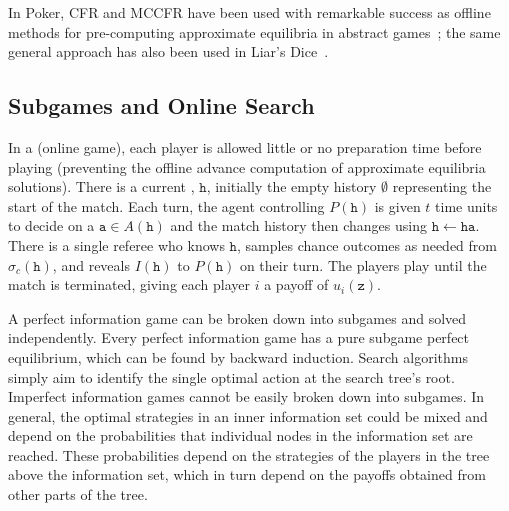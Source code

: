 \documentclass[letterpaper]{article}
\newcommand{\tta}{\mathtt{a}}
\newcommand{\tth}{\mathtt{h}}
\newcommand{\ttz}{\mathtt{z}}
\newcommand{\defword}[1]{\textbf{\boldmath{#1}}}
\begin{document}
In Poker, CFR and MCCFR have been used with remarkable success as offline methods 
for pre-computing approximate equilibria in abstract games~\cite{CFR,Johanson12CFRBR}; the same general 
approach has also been used in Liar's Dice~\cite{Lanctot12IR,Neller11}. 

\subsection{Subgames and Online Search}


In a \defword{match} (online game), each player is allowed little or no preparation time before playing (preventing the offline advance computation of approximate equilibria solutions).
There is a current \defword{match history}, $\tth$, initially the empty history $\emptyset$ representing the start of the match. Each turn, 
the agent controlling $P(\tth)$ is given $t$ time units to decide on a \defword{match action} $\tta \in A(\tth)$ and the 
match history then changes using $\tth \leftarrow \tth \tta$. There is a single referee who knows $\tth$, samples chance outcomes 
as needed from $\sigma_c(\tth)$, and reveals $I(\tth)$ to $P(\tth)$ on their turn. The players play until the match is terminated, 
giving each player $i$ a payoff of $u_i(\ttz)$.


A perfect information game can be broken down into subgames and solved independently. 
Every perfect information game has a pure subgame perfect equilibrium, which can be found by backward induction. 
Search algorithms simply aim to identify the single optimal action at the search tree's root. 
Imperfect information games cannot be easily broken down into subgames. In general, the optimal strategies in an inner 
information set could be mixed and depend on the probabilities that individual nodes in the information set are 
reached. These probabilities depend on the strategies of the players in the tree above the information set, which in 
turn depend on the payoffs obtained from other parts of the tree. 
\end{document}
